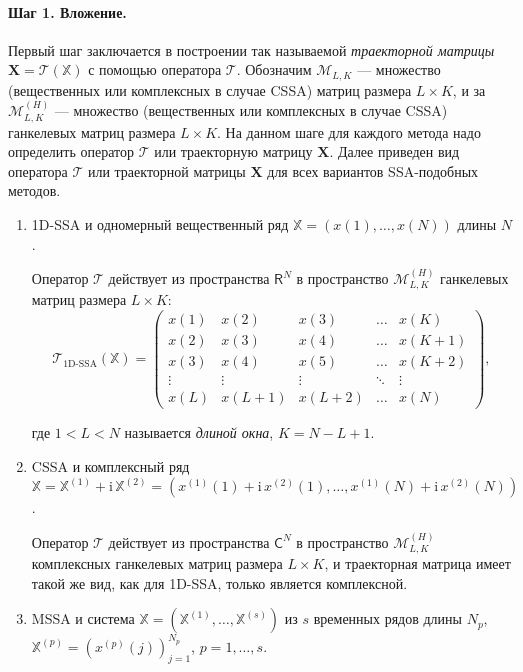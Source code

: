 \documentclass[specialist,
               substylefile = spbu.rtx,
               subf,href,colorlinks=true, 12pt]{disser}
\newcommand{\I}{\mathrm{i}}
\begin{document}
\paragraph{Шаг 1. Вложение.} Первый шаг заключается в построении так называемой \textit{траекторной матрицы} $\mathbf{X} = \mathcal{T}\left(\mathbb{X} \right)$ с помощью оператора $\mathcal{T}$. 
Обозначим $\mathcal{M}_{L,K}$ --- множество (вещественных или комплексных в случае CSSA) матриц размера $L \times K$, и за $\mathcal{M}_{L,K}^{(H)}$ --- множество (вещественных или комплексных в случае CSSA) ганкелевых матриц размера $L \times K$.
На данном шаге для каждого метода надо определить оператор $\mathcal{T}$ или траекторную матрицу $\mathbf{X}$.
Далее приведен  вид  оператора $\mathcal{T}$ или траекторной матрицы $\mathbf{X}$ для всех вариантов SSA-подобных методов.
\begin{enumerate}
\item 1D-SSA и одномерный вещественный ряд $\mathbb{X}= (x(1),\ldots,x(N))$ длины $N$. 

Оператор $\mathcal{T}$ действует из пространства $\mathsf{R}^N$ в пространство $\mathcal{M}_{L,K}^{(H)}$ ганкелевых матриц размера $L \times K$:
\begin{equation*}
\mathcal{T}_{\text{1D-SSA}}(\mathbb{X}) = \begin{pmatrix}
			x(1) & x(2) & x(3) & \ldots & x({K}) \\
			x(2) & x(3) & x(4) & \ldots & x({K+1}) \\
			x(3) & x(4) & x(5) & \ldots & x({K+2}) \\
			\vdots &\vdots & \vdots & \ddots & \vdots \\
			x({L}) & x({L+1}) & x({L+2}) & \ldots & x({N})  
			\end{pmatrix},
\end{equation*}

где $1<L<N$ называется \textit{длиной окна}, $K=N-L+1$.
\item CSSA и комплексный ряд $\mathbb{X}=\mathbb{X}^{(1)} + \I \,\mathbb{X}^{(2)}= \left(x^{(1)}(1) + \I\,x^{(2)}(1) ,\ldots,x^{(1)}(N) + \I\,x^{(2)}(N)\right)$.

Оператор $\mathcal{T}$ действует из пространства $\mathsf{C}^N$ в пространство $\mathcal{M}_{L,K}^{(H)}$ комплексных ганкелевых матриц размера $L \times K$, и траекторная матрица имеет такой же вид, как для 1D-SSA, только является комплексной.
 
\item MSSA и система $\mathbb{X}=\left(\mathbb{X}^{(1)},
 \ldots,\mathbb{X}^{(s)}\right)$ из $s$ временных рядов длины $N_p$, $\mathbb{X}^{(p)} = \left( x^{(p)}(j) \right)_{j=1}^{N_p}$, $p=1,\ldots,s$.
 

\end{enumerate}
\end{document}
